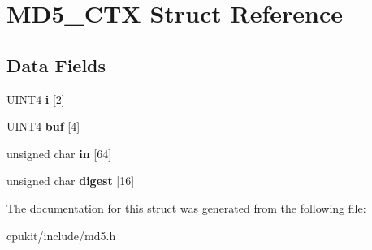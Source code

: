 \hypertarget{structMD5__CTX}{}\section{M\+D5\+\_\+\+C\+TX Struct Reference}
\label{structMD5__CTX}
\subsection*{Data Fields}
\begin{DoxyCompactItemize}
\item 
\mbox{\label{structMD5__CTX_a39a2cdb3b8d9d8ef30ab23957f8abd1a}} 
U\+I\+N\+T4 {\bfseries i} \mbox{[}2\mbox{]}
\item 
\mbox{\label{structMD5__CTX_ab4197e1536a9feac37e6ed928e6cbb3c}} 
U\+I\+N\+T4 {\bfseries buf} \mbox{[}4\mbox{]}
\item 
\mbox{\label{structMD5__CTX_ad7c0e27c818a56e6601d9cf0d0a785a0}} 
unsigned char {\bfseries in} \mbox{[}64\mbox{]}
\item 
\mbox{\label{structMD5__CTX_aad4ff5a61733cde2709a43b2485a0063}} 
unsigned char {\bfseries digest} \mbox{[}16\mbox{]}
\end{DoxyCompactItemize}


The documentation for this struct was generated from the following file\+:\begin{DoxyCompactItemize}
\item 
cpukit/include/md5.\+h\end{DoxyCompactItemize}
